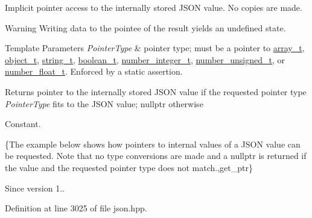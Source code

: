 Implicit pointer access to the internally stored J\+S\+O\+N value. No copies are made.

\begin{DoxyWarning}{Warning}
Writing data to the pointee of the result yields an undefined state.
\end{DoxyWarning}

\begin{DoxyTemplParams}{Template Parameters}
{\em Pointer\+Type} & pointer type; must be a pointer to \hyperlink{classnlohmann_1_1basic__json_ab00b882d39306d663c23dab110f5cae0}{array\+\_\+t}, \hyperlink{classnlohmann_1_1basic__json_a0ac9894c9de8dc551cf2e5f1c605537f}{object\+\_\+t}, \hyperlink{classnlohmann_1_1basic__json_ab63e618bbb0371042b1bec17f5891f42}{string\+\_\+t}, \hyperlink{classnlohmann_1_1basic__json_af3bc3e83aa162d7ba4df16a949872723}{boolean\+\_\+t}, \hyperlink{classnlohmann_1_1basic__json_ac4b10b2364f26ce47bdb9a413ff04a59}{number\+\_\+integer\+\_\+t}, \hyperlink{classnlohmann_1_1basic__json_a60a04166c122072ab11eaf9845d9cd1d}{number\+\_\+unsigned\+\_\+t}, or \hyperlink{classnlohmann_1_1basic__json_a74a0013e847fdc574b48f931f0e757e1}{number\+\_\+float\+\_\+t}. Enforced by a static assertion.\\
\hline
\end{DoxyTemplParams}
\begin{DoxyReturn}{Returns}
pointer to the internally stored J\+S\+O\+N value if the requested pointer type {\itshape Pointer\+Type} fits to the J\+S\+O\+N value; {\ttfamily nullptr} otherwise
\end{DoxyReturn}
Constant.

\{The example below shows how pointers to internal values of a J\+S\+O\+N value can be requested. Note that no type conversions are made and a {\ttfamily nullptr} is returned if the value and the requested pointer type does not match.,get\+\_\+ptr\}

\begin{DoxySince}{Since}
version 1.. 
\end{DoxySince}


Definition at line 3025 of file json.\+hpp.

\hypertarget{classnlohmann_1_1basic__json_aad65e0bc388897192bf361c24c1d6dda}{}
